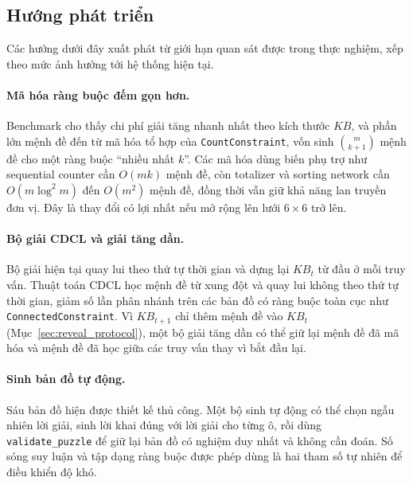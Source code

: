 \subsection{Hướng phát triển}
\label{sec:future_work}

Các hướng dưới đây xuất phát từ giới hạn quan sát được trong thực nghiệm, xếp
theo mức ảnh hưởng tới hệ thống hiện tại.

\begin{sloppypar}
\paragraph{Mã hóa ràng buộc đếm gọn hơn.}
Benchmark cho thấy chi phí giải tăng nhanh nhất theo kích thước $\mathit{KB}$,
và phần lớn mệnh đề đến từ mã hóa tổ hợp của \texttt{CountConstraint}, vốn sinh
$\binom{m}{k+1}$ mệnh đề cho một ràng buộc ``nhiều nhất $k$''. Các mã hóa dùng
biến phụ trợ như sequential counter \cite{sinz2005} cần $O(mk)$ mệnh đề, còn
totalizer \cite{bailleux2003} và sorting network \cite{batcher1968} cần
$O(m \log^2 m)$ đến $O(m^2)$ mệnh đề, đồng thời vẫn giữ khả năng lan truyền đơn
vị. Đây là thay đổi có lợi nhất nếu mở rộng lên lưới $6\times6$ trở lên.
\end{sloppypar}

\paragraph{Bộ giải CDCL và giải tăng dần.}
Bộ giải hiện tại quay lui theo thứ tự thời gian và dựng lại $\mathit{KB}_t$ từ
đầu ở mỗi truy vấn. Thuật toán CDCL \cite{marques1999grasp} học mệnh đề từ xung
đột và quay lui không theo thứ tự thời gian, giảm số lần phân nhánh trên các
bản đồ có ràng buộc toàn cục như \texttt{ConnectedConstraint}. Vì
$\mathit{KB}_{t+1}$ chỉ thêm mệnh đề vào $\mathit{KB}_t$
(Mục~\ref{sec:reveal_protocol}), một bộ giải tăng dần có thể giữ lại mệnh đề
đã mã hóa và mệnh đề đã học giữa các truy vấn thay vì bắt đầu lại.

\paragraph{Sinh bản đồ tự động.}
Sáu bản đồ hiện được thiết kế thủ công. Một bộ sinh tự động có thể chọn ngẫu
nhiên lời giải, sinh lời khai đúng với lời giải cho từng ô, rồi dùng
\texttt{validate\_puzzle} để giữ lại bản đồ có nghiệm duy nhất và không cần
đoán. Số sóng suy luận và tập dạng ràng buộc được phép dùng là hai tham số tự
nhiên để điều khiển độ khó.

